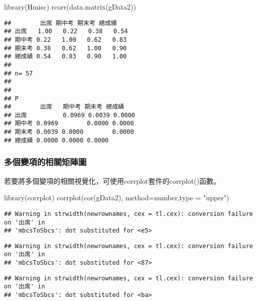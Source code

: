 \documentclass[
]{book}
\newenvironment{Shaded}{\begin{snugshade}}{\end{snugshade}}
\newcommand{\AttributeTok}[1]{\textcolor[rgb]{0.77,0.63,0.00}{#1}}
\newcommand{\FunctionTok}[1]{\textcolor[rgb]{0.00,0.00,0.00}{#1}}
\newcommand{\NormalTok}[1]{#1}
\newcommand{\StringTok}[1]{\textcolor[rgb]{0.31,0.60,0.02}{#1}}
\begin{document}
\begin{Shaded}
\begin{Highlighting}[]
\FunctionTok{library}\NormalTok{(Hmisc)}
\FunctionTok{rcorr}\NormalTok{(}\FunctionTok{data.matrix}\NormalTok{(gData2))}
\end{Highlighting}
\end{Shaded}

\begin{verbatim}
##        出席 期中考 期末考 總成績
## 出席   1.00   0.22   0.38   0.54
## 期中考 0.22   1.00   0.62   0.83
## 期末考 0.38   0.62   1.00   0.90
## 總成績 0.54   0.83   0.90   1.00
## 
## n= 57 
## 
## 
## P
##        出席   期中考 期末考 總成績
## 出席          0.0969 0.0039 0.0000
## 期中考 0.0969        0.0000 0.0000
## 期末考 0.0039 0.0000        0.0000
## 總成績 0.0000 0.0000 0.0000
\end{verbatim}

\hypertarget{ux591aux500bux8b8aux9805ux7684ux76f8ux95dcux77e9ux9663ux5716}{%
\subsubsection{多個變項的相關矩陣圖}\label{ux591aux500bux8b8aux9805ux7684ux76f8ux95dcux77e9ux9663ux5716}}

若要將多個變項的相關視覺化，可使用corrplot套件的corrplot()函數。

\begin{Shaded}
\begin{Highlighting}[]
\FunctionTok{library}\NormalTok{(corrplot)}
\FunctionTok{corrplot}\NormalTok{(}\FunctionTok{cor}\NormalTok{(gData2), }\AttributeTok{method=}\StringTok{\textquotesingle{}number\textquotesingle{}}\NormalTok{,}\AttributeTok{type =} \StringTok{"upper"}\NormalTok{)}
\end{Highlighting}
\end{Shaded}

\begin{verbatim}
## Warning in strwidth(newrownames, cex = tl.cex): conversion failure on '出席' in
## 'mbcsToSbcs': dot substituted for <e5>
\end{verbatim}

\begin{verbatim}
## Warning in strwidth(newrownames, cex = tl.cex): conversion failure on '出席' in
## 'mbcsToSbcs': dot substituted for <87>
\end{verbatim}

\begin{verbatim}
## Warning in strwidth(newrownames, cex = tl.cex): conversion failure on '出席' in
## 'mbcsToSbcs': dot substituted for <ba>
\end{verbatim}
\end{document}
